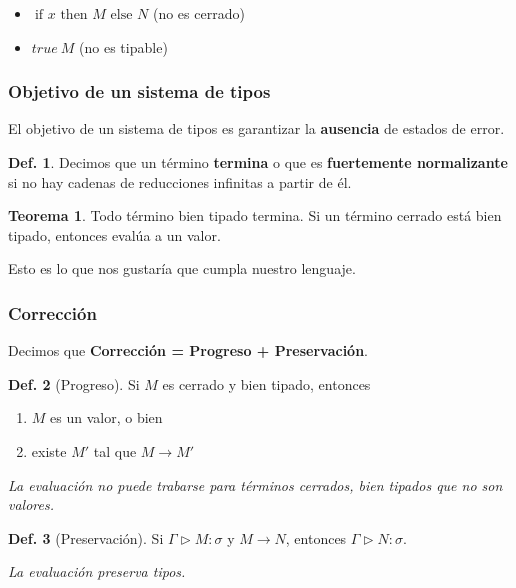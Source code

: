 \documentclass{report}
\theoremstyle{definition} %
\newtheorem{theorem}{Teorema}[chapter]
\newtheorem{definition}{Def.}[chapter]
\newcommand{\ifte}[3]{\ \text{if } #1 \text{ then } #2 \text{ else } #3}
\newcommand{\app}[2]{#1 \ #2} %
\newcommand{\tipa}[3]{#1 \rhd #2 : #3} %
\newcommand{\Gtipa}[2]{\tipa{\Gamma}{#1}{#2}}
\newcommand{\reduces}{\to}
\newcommand{\reduce}[2]{#1 \reduces #2}
\begin{document}
\begin{itemize}
    \item $\ifte{x}{M}{N}$ (no es cerrado)
    \item $\app{true}{M}$ (no es tipable)
\end{itemize}

\subsubsection{Objetivo de un sistema de tipos}

El objetivo de un sistema de tipos es garantizar la \textbf{ausencia} de estados
de error.

\begin{definition}
    Decimos que un término \textbf{termina} o que es \textbf{fuertemente
normalizante} si no hay cadenas de reducciones infinitas a partir de él.
\end{definition}

\begin{theorem}
    Todo término bien tipado termina. Si un término cerrado está bien tipado,
    entonces evalúa a un valor.
\end{theorem}

Esto es lo que nos gustaría que cumpla nuestro lenguaje.

\subsubsection{Corrección}\label{sec:correccion}

Decimos que \textbf{Corrección = Progreso + Preservación}.

\begin{definition}[Progreso]
    Si $M$ es cerrado y bien tipado, entonces
    \begin{enumerate}
        \item $M$ es un valor, o bien
        \item existe $M'$ tal que $\reduce{M}{M'}$
    \end{enumerate}

    \textit{La evaluación no puede trabarse para términos cerrados, bien tipados que no son valores.}
\end{definition}

\begin{definition}[Preservación]
    Si $\Gtipa{M}{\sigma}$ y $\reduce{M}{N}$, entonces $\Gtipa{N}{\sigma}$.

    \textit{La evaluación preserva tipos.}
\end{definition}
\end{document}
